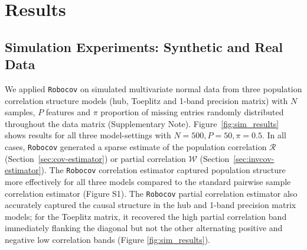 \documentclass{bioinfo}
\def\Robocov{\texttt{Robocov}}
\begin{document}
\begin{methods}

\end{methods}

\section{Results}\label{sec:results}

\subsection*{Simulation Experiments: Synthetic and Real Data}

We applied \Robocov{} on simulated multivariate normal data from three population correlation structure models (hub, Toeplitz and 1-band precision matrix) with $N$ samples, $P$ features and $\pi$ proportion of missing entries randomly distributed throughout the data matrix (Supplementary Note). Figure~\ref{fig:sim_results} shows results for all three model-settings with $N = 500, P = 50, \pi = 0.5$. In all cases, \Robocov{} generated a sparse estimate of the population correlation $\mathcal{R}$ (Section~\ref{sec:cov-estimator}) or partial correlation $\mathcal{W}$ (Section~\ref{sec:invcov-estimator}). The \Robocov{} correlation estimator captured population structure more effectively for all three models compared to the standard pairwise sample correlation estimator (Figure S1). The \Robocov{} partial correlation estimator also accurately captured the causal structure in the hub and 1-band precision matrix models; for the Toeplitz matrix, it recovered the high partial correlation band immediately flanking the diagonal but not the other alternating positive and negative low correlation bands (Figure \ref{fig:sim_results}). 
\end{document}
